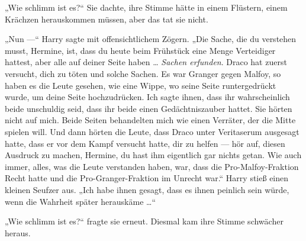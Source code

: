 „Wie schlimm ist es?“ Sie dachte, ihre Stimme hätte in einem Flüstern, einem Krächzen herauskommen müssen, aber das tat sie nicht.

„Nun —“ Harry sagte mit offensichtlichem Zögern.
„Die Sache, die du verstehen musst, Hermine, ist, dass du heute beim Frühstück eine Menge Verteidiger hattest, aber alle auf deiner Seite haben … \emph{Sachen erfunden}. Draco hat zuerst versucht, dich zu töten und solche Sachen. Es war Granger gegen Malfoy, so haben es die Leute gesehen, wie eine Wippe, wo seine Seite runtergedrückt wurde, um deine Seite hochzudrücken. Ich sagte ihnen, dass ihr wahrscheinlich beide unschuldig seid, dass ihr beide einen Gedächtniszauber hattet. Sie hörten nicht auf mich. Beide Seiten behandelten mich wie einen Verräter, der die Mitte spielen will. Und dann hörten die Leute, dass Draco unter Veritaserum ausgesagt hatte, dass er vor dem Kampf versucht hatte, dir zu helfen — hör auf, diesen Ausdruck zu machen, Hermine, du hast ihm eigentlich gar nichts getan. Wie auch immer, alles, was die Leute verstanden haben, war, dass die Pro-Malfoy-Fraktion Recht hatte und die Pro-Granger-Fraktion im Unrecht war.“ Harry stieß einen kleinen Seufzer aus.
„Ich habe ihnen gesagt, dass es ihnen peinlich sein würde, wenn die Wahrheit später herauskäme …“

„Wie schlimm ist es?“ fragte sie erneut. Diesmal kam ihre Stimme schwächer heraus.


